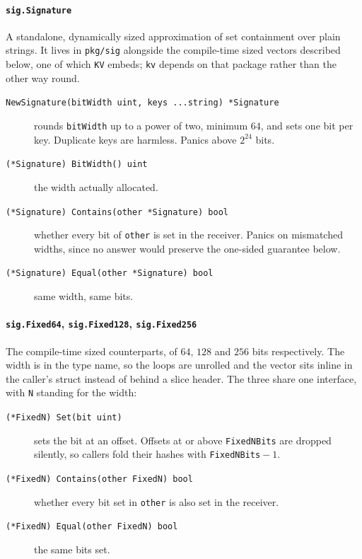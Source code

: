 \documentclass[11pt]{article}
\newcommand{\code}[1]{\texttt{#1}}
\begin{document}
\paragraph{\code{sig.Signature}} A standalone, dynamically sized approximation
of set containment over plain strings. It lives in \code{pkg/sig} alongside the
compile-time sized vectors described below, one of which \code{KV} embeds;
\code{kv} depends on that package rather than the other way round.

\begin{description}
  \item[\code{NewSignature(bitWidth uint, keys ...string) *Signature}] rounds
    \code{bitWidth} up to a power of two, minimum $64$, and sets one bit per
    key. Duplicate keys are harmless. Panics above $2^{24}$ bits.
  \item[\code{(*Signature) BitWidth() uint}] the width actually allocated.
  \item[\code{(*Signature) Contains(other *Signature) bool}] whether every bit
    of \code{other} is set in the receiver. Panics on mismatched widths, since
    no answer would preserve the one-sided guarantee below.
  \item[\code{(*Signature) Equal(other *Signature) bool}] same width, same bits.
\end{description}

\paragraph{\code{sig.Fixed64}, \code{sig.Fixed128}, \code{sig.Fixed256}} The
compile-time sized counterparts, of $64$, $128$ and $256$ bits respectively.
The width is in the type name, so the loops are unrolled and the vector sits
inline in the caller's struct instead of behind a slice header. The three share
one interface, with \code{N} standing for the width:

\begin{description}
  \item[\code{(*FixedN) Set(bit uint)}] sets the bit at an offset. Offsets at or
    above \code{FixedNBits} are dropped silently, so callers fold their hashes
    with \code{FixedNBits}${}-1$.
  \item[\code{(*FixedN) Contains(other FixedN) bool}] whether every bit set in
    \code{other} is also set in the receiver.
  \item[\code{(*FixedN) Equal(other FixedN) bool}] the same bits set.
\end{description}
\end{document}
